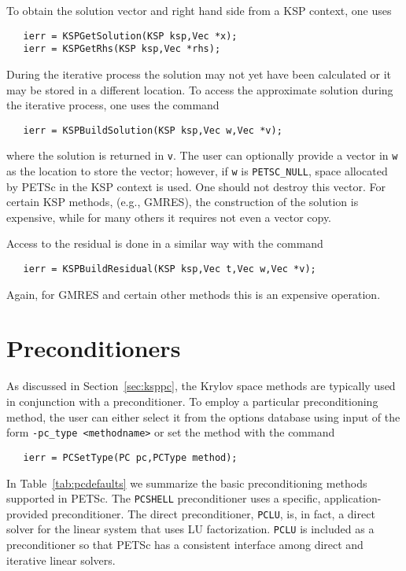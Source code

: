 To obtain the solution vector and right hand side from a KSP 
context, one uses  
\begin{verbatim}
   ierr = KSPGetSolution(KSP ksp,Vec *x);
   ierr = KSPGetRhs(KSP ksp,Vec *rhs);
\end{verbatim}
During   the iterative process
the solution may not yet have been calculated or it may be stored in 
a different location. To access the approximate solution during the 
iterative process, one uses the command 
\begin{verbatim}
   ierr = KSPBuildSolution(KSP ksp,Vec w,Vec *v);
\end{verbatim}
where the solution is returned in {\tt v}. The user can optionally provide
a vector in {\tt w} as the location to store the vector; however, if 
{\tt w} is {\tt PETSC\_NULL}, space allocated by PETSc in the KSP context is 
used. One should not destroy this vector. For certain KSP methods, 
(e.g., GMRES), the construction of the solution is expensive, while for many 
others it requires not even a vector copy. 

Access to the residual is done in a similar way with the 
command 
\begin{verbatim}
   ierr = KSPBuildResidual(KSP ksp,Vec t,Vec w,Vec *v);
\end{verbatim}
Again, for GMRES and certain other methods this is an expensive 
operation.

\section{Preconditioners} 
\label{sec:pc}

As discussed in Section~\ref{sec:ksppc}, the Krylov space methods are
typically used in conjunction with a preconditioner.
To employ a particular preconditioning method, the user can either select 
it from the options database using input of the form 
{\tt -pc\_type <methodname>} or set the method with the 
command  
\begin{verbatim}
   ierr = PCSetType(PC pc,PCType method);
\end{verbatim}
In Table~\ref{tab:pcdefaults} we summarize the basic
preconditioning methods supported in PETSc. 
   
  
The {\tt PCSHELL} preconditioner uses a specific,
application-provided preconditioner.  The direct preconditioner, {\tt PCLU},
is, in fact, a direct solver for the linear system that uses LU
factorization. {\tt PCLU} is included as a preconditioner so that PETSc has a
consistent interface among direct and iterative linear solvers.

